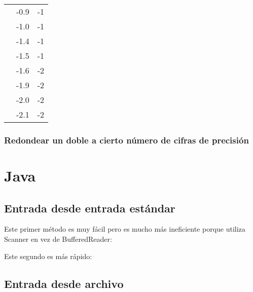 \documentclass[10pt,letterpaper,twocolumn]{article}
\newcommand{\codigofuente}[1]{

\dotfill
}
\begin{document}
\begin{center}
\begin{tabular}{| c | c | c | }
                                         & -0.9  & -1 \\ \cline{2-3}
                                         & -1.0 & -1 \\ \cline{2-3}
                                         & -1.4 & -1 \\ \cline{2-3}
                                         & -1.5 & -1 \\ \cline{2-3}
                                         & -1.6 & -2 \\ \cline{2-3}
                                         & -1.9 & -2 \\ \cline{2-3}
                                         & -2.0 & -2 \\ \cline{2-3}
                                         & -2.1 & -2 \\ \cline{2-3}
    \hline
  \end{tabular}
  \renewcommand{\arraystretch}{1}
\end{center}

\subsubsection{Redondear un doble a cierto número de cifras de precisión}


\section{Java}
\subsection{Entrada desde entrada estándar}
Este primer método es muy fácil pero es mucho más ineficiente porque utiliza Scanner en vez de BufferedReader:
\codigofuente{./src/java/io_estandar_easy.java}

\bigskip

Este segundo es más rápido:
\codigofuente{./src/java/io_estandar.java}
\subsection{Entrada desde archivo}
\codigofuente{./src/java/io_file.java}
\end{document}
